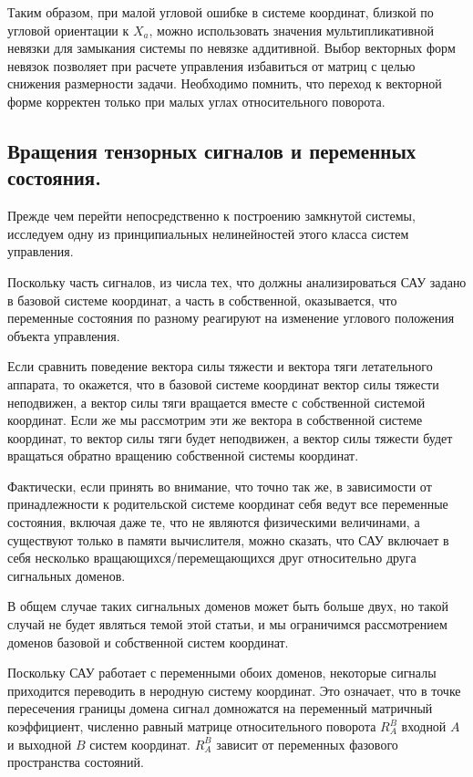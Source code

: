 \documentclass[a4paper]{article}
\begin{document}
Таким образом, при малой угловой ошибке в системе координат, близкой по угловой ориентации к $X_a$, можно использовать значения мультипликативной невязки для замыкания системы по невязке аддитивной. Выбор векторных форм невязок позволяет при расчете управления избавиться от матриц с целью снижения размерности задачи. Необходимо помнить, что переход к векторной форме корректен только при малых углах относительного поворота.

\subsection{Вращения тензорных сигналов и переменных состояния.}
Прежде чем перейти непосредственно к построению замкнутой системы, исследуем одну из принципиальных нелинейностей этого класса систем управления.

Поскольку часть сигналов, из числа тех, что должны анализироваться САУ задано в базовой системе координат, а часть в собственной, оказывается, что переменные состояния по разному реагируют на изменение углового положения объекта управления. 

Если сравнить поведение вектора силы тяжести и вектора тяги летательного аппарата, то окажется, что в базовой системе координат вектор силы тяжести неподвижен, а вектор силы тяги вращается вместе с собственной системой координат. Если же мы рассмотрим эти же вектора в собственной системе координат, то вектор силы тяги будет неподвижен, а вектор силы тяжести будет вращаться обратно вращению собственной системы координат.

Фактически, если принять во внимание, что точно так же, в зависимости от принадлежности к родительской системе координат себя ведут все переменные состояния, включая даже те, что не являются физическими величинами, а существуют только в памяти вычислителя, можно сказать, что САУ включает в себя несколько вращающихся/перемещающихся друг относительно друга сигнальных доменов.

В общем случае таких сигнальных доменов может быть больше двух, но такой случай не будет являться темой этой статьи, и мы ограничимся рассмотрением доменов базовой и собственной систем координат. 

Поскольку САУ работает с переменными обоих доменов, некоторые сигналы приходится переводить в неродную систему координат. Это означает, что в точке пересечения границы домена сигнал домножатся на переменный матричный коэффициент, численно равный матрице относительного поворота $R_A^B$ входной $A$ и выходной $B$ систем координат. $R_A^B$ зависит от переменных фазового пространства состояний.
\end{document}
